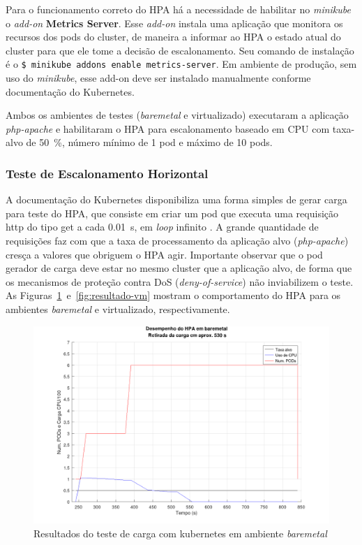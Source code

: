 \documentclass[12pt]{article}
\begin{document}
Para o funcionamento correto do HPA há a necessidade de habilitar no \textit{minikube} o \textit{add-on} \textbf{Metrics Server}. Esse \textit{add-on} instala uma aplicação que monitora os recursos dos pods do cluster, de maneira a informar ao HPA o estado atual do cluster para que ele tome a decisão de escalonamento. Seu comando de instalação é o \verb|$ minikube addons enable metrics-server|. Em ambiente de produção, sem uso do \textit{minikube}, esse add-on deve ser instalado manualmente conforme documentação do Kubernetes.

Ambos os ambientes de testes (\textit{baremetal} e virtualizado) executaram a aplicação \textit{php-apache} e habilitaram o HPA para escalonamento baseado em CPU com taxa-alvo de 50~\%, número mínimo de 1 pod e máximo de 10 pods.

\subsubsection{Teste de Escalonamento Horizontal}\label{subsec:teste-hpa-local}

A documentação do Kubernetes disponibiliza uma forma simples de gerar carga para teste do HPA, que consiste em criar um pod que executa uma requisição http do tipo get a cada 0.01~s, em \textit{loop} infinito \cite{kubernetes_horizontalpodautoscaler_nodate}. A grande quantidade de requisições faz com que a taxa de processamento da aplicação alvo (\textit{php-apache}) cresça a valores que obriguem o HPA agir. Importante observar que o pod gerador de carga deve estar no mesmo cluster que a aplicação alvo, de forma que os mecanismos de proteção contra DoS (\textit{deny-of-service}) não inviabilizem o teste. As Figuras~\ref{fig:resultado-baremetal}~e~\ref{fig:resultado-vm} mostram o comportamento do HPA para os ambientes \textit{baremetal} e virtualizado, respectivamente.

\begin{figure}[htbp]
\centering
\includegraphics[width=.9\textwidth]{baremetal.png}
\caption{Resultados do teste de carga com kubernetes em ambiente \textit{baremetal}}
\label{fig:resultado-baremetal}
\end{figure}
\end{document}
